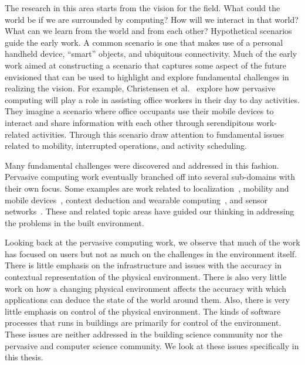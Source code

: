 The research in this area starts from the vision for the field.  What could the world be if we are surrounded by computing?
How will we interact in that world?  What can we learn from the world and from each other?  Hypothetical scenarios
guide the early work.  A common scenario is one that makes use of a personal handheld device, ``smart'' objects, and 
ubiquitous connectivity.  Much of the early work aimed at constructing a scenario that captures some aspect of
the future envisioned that can be used to highlight and explore fundamental challenges in realizing the vision.
For example, Christensen et al.~\cite{Christensen_2002} explore how pervasive computing will play a role in assisting
office workers in their day to day activities.  They imagine a scenario where office occupants use their mobile devices
to interact and share information with each other through serendipitous work-related activities.  Through this scenario
draw attention to fundamental issues related to mobility, interrupted operations, and activity scheduling.%

Many fundamental challenges were discovered and addressed in this fashion.  Pervasive computing work eventually branched
off into several sub-domains with their own focus.  Some examples are work related to 
localization~\cite{Castro01aprobabilistic,Koo,Romer03thelighthouse,Yoon2013}, 
mobility and mobile devices~\cite{Haritaoglu:2001:ILR:647987.741331,Want02thepersonal,Jiang:2011:MPM:2030112.2030150},
context deduction and wearable computing~\cite{Holmquist01smart,Lukowicz2002,Christensen_2002,Rossi:2011:RWC:2030112.2030238},
and sensor networks~\cite{Conner:2001:MEL:647987.741329,Lymberopoulos09amethodology}.  These and related
topic areas have guided our thinking in addressing the problems in the built environment.

Looking back at the pervasive computing work, we observe that much of the work has focused on users but not as much on 
the challenges in the environment itself.  There is little
emphasis on the infrastructure and issues with the accuracy in contextual representation of the physical environment.
There is also very little work on how a changing physical environment affects the accuracy with which applications can 
deduce the state of the world around them.  Also, there is very little emphasis on control of the physical environment.
The kinds of software processes that runs in buildings are primarily for control of the environment.  These issues
are neither addressed in the building science community nor the pervasive and computer science community.  We look at these
issues specifically in this thesis.



